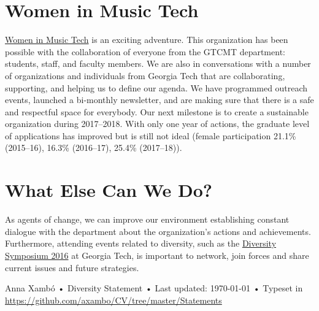 \documentclass[10pt, a4paper]{article}
\begin{document}
\section*{Women in Music Tech}

\href{http://www.gtcmt.gatech.edu/womeninmusictech}{Women in Music Tech} is an exciting adventure. This organization has been possible with the collaboration of everyone from the GTCMT department: students, staff, and faculty members. We are also in conversations with a number of organizations and individuals from Georgia Tech that are collaborating, supporting, and helping us to define our agenda. We have programmed outreach events, launched a bi-monthly newsletter, and are making sure that there is a safe and respectful space for everybody. Our next milestone is to create a sustainable organization during 2017--2018. With only one year of actions, the graduate level of applications has improved but is still not ideal (female participation 21.1\% (2015--16), 16.3\% (2016--17), 25.4\% (2017--18)).

\section*{What Else Can We Do?}

As agents of change, we can improve our environment establishing constant dialogue with the department about the organization's actions and achievements. Furthermore, attending events related to diversity, such as the \href{http://www.diversity.gatech.edu/diversitysymposium}{Diversity Symposium 2016} at Georgia Tech, is important to network, join forces and share current issues and future strategies. 

\vfill{}

\begin{center}
{\scriptsize  Anna Xambó •\- Diversity Statement •\- Last updated: \today\- •\- %
Typeset in \href{http://nitens.org/taraborelli/cvtex}{
\XeTeX }\\
\href{https://github.com/axambo/CV/tree/master/Statements}{https://github.com/axambo/CV/tree/master/Statements}}
\end{center}
\end{document}

